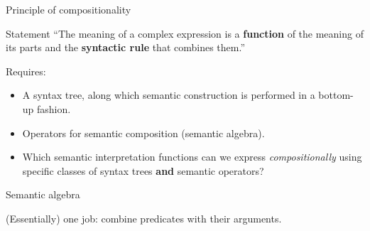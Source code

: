 \documentclass{beamer}
\begin{document}
\begin{frame}{Principle of compositionality}
  \begin{block}{Statement}
    ``The meaning of a complex expression is a \textbf{function} of the meaning of its parts and the \textbf{syntactic rule} that combines them.''
  \end{block}

  \begin{block}{Requires:}
    \begin{itemize}
    \item A syntax tree, along which semantic construction is performed in a bottom-up fashion.
    \item Operators for semantic composition (semantic algebra).
    \end{itemize}
  \end{block}

  \begin{itemize}
  \item \alert{Which semantic interpretation functions can we express \emph{compositionally} using specific classes of syntax trees \textbf{and} semantic operators?}
  \end{itemize}
\end{frame}

\begin{frame}{Semantic algebra}
  \begin{block}{(Essentially) one job:}
    combine predicates with their arguments.
  \end{block}
  
  \begin{center}
  \end{center}
\end{frame}
\end{document}
